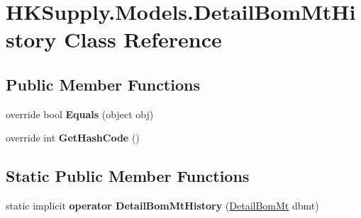 \hypertarget{class_h_k_supply_1_1_models_1_1_detail_bom_mt_history}{}\section{H\+K\+Supply.\+Models.\+Detail\+Bom\+Mt\+History Class Reference}
\label{class_h_k_supply_1_1_models_1_1_detail_bom_mt_history}
\subsection*{Public Member Functions}
\begin{DoxyCompactItemize}
\item 
\mbox{\label{class_h_k_supply_1_1_models_1_1_detail_bom_mt_history_aa8dab0135c89f0e0570a865b25876ddc}} 
override bool {\bfseries Equals} (object obj)
\item 
\mbox{\label{class_h_k_supply_1_1_models_1_1_detail_bom_mt_history_a0bb7475d01dcb465de0b0480d49a3e02}} 
override int {\bfseries Get\+Hash\+Code} ()
\end{DoxyCompactItemize}
\subsection*{Static Public Member Functions}
\begin{DoxyCompactItemize}
\item 
\mbox{\label{class_h_k_supply_1_1_models_1_1_detail_bom_mt_history_a3bb0a150e5f8a356451aa2cbb20e4838}} 
static implicit {\bfseries operator Detail\+Bom\+Mt\+History} (\mbox{\hyperlink{class_h_k_supply_1_1_models_1_1_detail_bom_mt}{Detail\+Bom\+Mt}} dbmt)
\end{DoxyCompactItemize}
